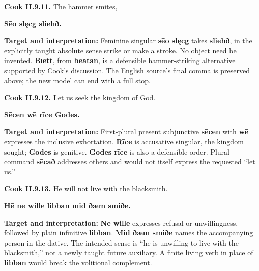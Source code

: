 \par\begin{minipage}{\linewidth}\raggedright
\textbf{Cook II.9.11.} The hammer smites,

\textbf{Sēo slęcg sliehð.}

\textbf{Target and interpretation:} Feminine singular \textbf{sēo slęcg} takes \textbf{sliehð}, in the explicitly taught absolute sense strike or make a stroke. No object need be invented. \textbf{Bīett}, from \textbf{bēatan}, is a defensible hammer-striking alternative supported by Cook's discussion. The English source's final comma is preserved above; the new model can end with a full stop.

\end{minipage}\par\addvspace{4pt}

\par\begin{minipage}{\linewidth}\raggedright
\textbf{Cook II.9.12.} Let us seek the kingdom of God.

\textbf{Sēcen wē rīce Godes.}

\textbf{Target and interpretation:} First-plural present subjunctive \textbf{sēcen} with \textbf{wē} expresses the inclusive exhortation. \textbf{Rīce} is accusative singular, the kingdom sought; \textbf{Godes} is genitive. \textbf{Godes rīce} is also a defensible order. Plural command \textbf{sēcað} addresses others and would not itself express the requested “let us.”

\end{minipage}\par\addvspace{4pt}

\par\begin{minipage}{\linewidth}\raggedright
\textbf{Cook II.9.13.} He will not live with the blacksmith.

\textbf{Hē ne wille libban mid ðǣm smiðe.}

\textbf{Target and interpretation:} \textbf{Ne wille} expresses refusal or unwillingness, followed by plain infinitive \textbf{libban}. \textbf{Mid ðǣm smiðe} names the accompanying person in the dative. The intended sense is “he is unwilling to live with the blacksmith,” not a newly taught future auxiliary. A finite living verb in place of \textbf{libban} would break the volitional complement.

\end{minipage}\par\addvspace{4pt}

